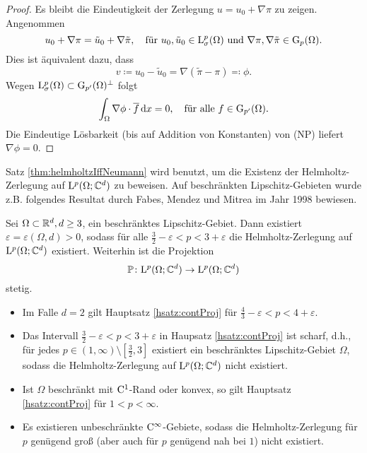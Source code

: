 \begin{proof}
  Es bleibt die Eindeutigkeit der Zerlegung $u = u_0 + \nabla \pi$ zu zeigen.
  Angenommen
  $$
  u_0 + \nabla \pi = \tilde u_0 + \nabla \tilde \pi, \quad\text{für }
  u_0,\tilde u_0 \in \mathrm{L}_\sigma^p(\Omega) \text{ und } \nabla \pi, \nabla \tilde \pi \in \mathrm{G}_p(\Omega).
  $$
  Dies ist äquivalent dazu, dass 
  $$
  v \coloneqq u_0 - \tilde u_0 = \nabla( \tilde \pi - \pi) \eqqcolon \phi.
  $$
  Wegen $\mathrm{L}_\sigma^p(\Omega) \subset \mathrm{G}_{p'}(\Omega)^\perp$ folgt
  $$
  \int_\Omega \nabla \phi \cdot \overline f \, {\operatorname{d}\!{x}} = 0, \quad\text{für alle } f \in \mathrm{G}_{p'}(\Omega).
  $$
  Die Eindeutige Lösbarkeit (bis auf Addition von Konstanten) von (NP) liefert $\nabla\phi = 0$.
\end{proof}

Satz \ref{thm:helmholtzIffNeumann} wird benutzt, um die Existenz der Helmholtz-Zerlegung auf $\mathrm{L}^p(\Omega; \mathbb{C}^d)$ zu beweisen.
Auf beschränkten Lipschitz-Gebieten wurde z.B. folgendes Resultat durch Fabes, Mendez und Mitrea im Jahr 1998 bewiesen.

\begin{hsatz}
  \label{hsatz:contProj}
  Sei $\Omega \subset \mathbb{R}^d, d \geq 3$, ein beschränktes Lipschitz-Gebiet.
  Dann existiert $\varepsilon = \varepsilon(\Omega, d) > 0$, sodass für alle $\frac{3}{2} - \varepsilon < p < 3 + \varepsilon$ die Helmholtz-Zerlegung auf $\mathrm{L}^p(\Omega; \mathbb{C}^d)$ existiert.
  Weiterhin ist die Projektion
  $$
  \operatorname{\mathbb{P}} \colon \mathrm{L}^p(\Omega; \mathbb{C}^d) \to \mathrm{L}^p(\Omega; \mathbb{C}^d)
  $$
  stetig.
\end{hsatz}

\begin{rem}
  \begin{itemize}
    \item Im Falle $d = 2$ gilt Hauptsatz \ref{hsatz:contProj} für $\frac{4}{3} - \varepsilon < p < 4 + \varepsilon$.
    \item Das Intervall $\frac{3}{2} - \varepsilon < p < 3 + \varepsilon$ in Haupsatz \ref{hsatz:contProj} ist scharf, d.h., für jedes $p \in (1,\infty) \setminus [\frac{3}{2}, 3]$ existiert ein beschränktes Lipschitz-Gebiet $\Omega$, sodass die Helmholtz-Zerlegung auf $\mathrm{L}^p(\Omega; \mathbb{C}^d)$ nicht existiert.
    \item Ist $\Omega$ beschränkt mit $\mathrm{C}^1$-Rand oder konvex, so gilt Hauptsatz \ref{hsatz:contProj} für $1 < p < \infty$.
    \item Es existieren unbeschränkte $\mathrm{C}^\infty$-Gebiete, sodass die Helmholtz-Zerlegung für $p$ genügend groß (aber auch für $p$ genügend nah bei $1$) nicht existiert.
  \end{itemize}
\end{rem}

